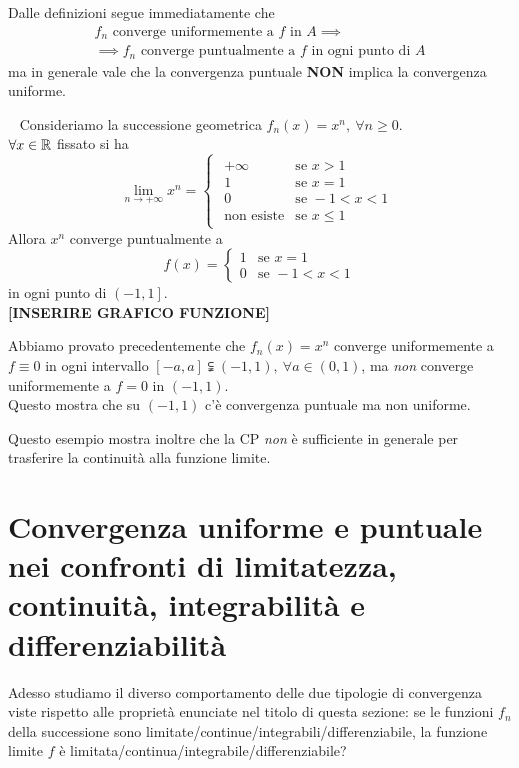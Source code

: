 Dalle definizioni segue immediatamente che
	\begin{multline}
	f_n\text{ converge uniformemente a }f\text{ in }A\implies\\
	\implies f_n\text{ converge puntualmente a }f\text{ in ogni punto di }A
\end{multline}
ma in generale vale che la convergenza puntuale \textbf{NON} implica la convergenza uniforme.
\begin{example}~{}
	Consideriamo la successione geometrica $f_n\left(x\right)=x^n,\ \forall n\geq 0$.\\
	$\forall x\in\mathbb{R}$ fissato si ha
	\begin{equation*}
		\lim_{n\to +\infty}x^n=
		\begin{cases}
			\begin{array}{ll}
				+\infty&\text{se }x>1\\
				1&\text{se }x=1\\
				0&\text{se }-1<x<1\\
				\text{non esiste}&\text{se }x\leq 1
			\end{array}
		\end{cases}
	\end{equation*}
Allora $x^n$ converge puntualmente a
\begin{equation*}
	f\left(x\right)=
	\begin{cases}
	1&\text{se }x=1\\
	0&\text{se }-1<x<1	
	\end{cases}
\end{equation*}
in ogni punto di $\left(-1,1\right]$.\\
\textbf{[INSERIRE GRAFICO FUNZIONE]} %
\end{example}
Abbiamo provato precedentemente che $f_n\left(x\right)=x^n$ converge uniformemente a $f\equiv 0$ in ogni intervallo $\left[-a,a\right]\subsetneqq\left(-1,1\right),\ \forall a\in\left(0,1\right)$, ma \textit{non} converge uniformemente a $f=0$ in $\left(-1,1\right)$.\\
Questo mostra che su $\left(-1,1\right)$ c'è convergenza puntuale ma non uniforme.
\begin{observe}
	Questo esempio mostra inoltre che la CP \textit{non} è sufficiente in generale per trasferire la continuità alla funzione limite.
\end{observe}
\section{Convergenza uniforme e puntuale nei confronti di limitatezza, continuità, integrabilità e differenziabilità}
Adesso studiamo il diverso comportamento delle due tipologie di convergenza viste rispetto alle proprietà enunciate nel titolo di questa sezione: se le funzioni $f_n$ della successione sono limitate/continue/integrabili/differenziabile, la funzione limite $f$ è limitata/continua/integrabile/differenziabile?
